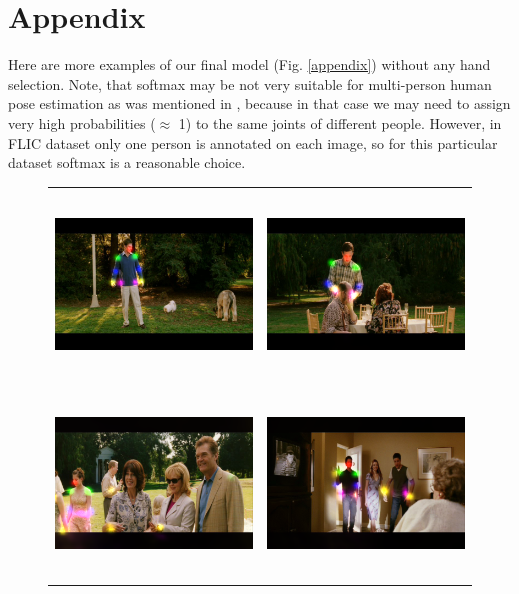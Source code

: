 \documentclass[a4paper,10pt]{article}
\begin{document}
	\section{Appendix}
	Here are more examples of our final model (Fig. \ref{appendix}) without any hand selection. Note, that softmax may be not very suitable for multi-person human pose estimation as was mentioned in \cite{deepcut}, because in that case we may need to assign very high probabilities ($\approx$ 1) to the same joints of different people. However, in FLIC dataset only one person is annotated on each image, so for this particular dataset softmax is a reasonable choice.
	\begin{figure}[H]
		\begin{tabular}{cc}
			\includegraphics[height=5cm]{img/ap_sm1.png} & 
			\includegraphics[height=5cm]{img/ap_sm2.png} \\
			\includegraphics[height=5cm]{img/ap_sm3.png} &
			\includegraphics[height=5cm]{img/ap_sm4.png} \\

\end{tabular}
\end{figure}
\end{document}

